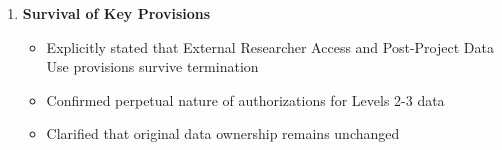 \documentclass[12pt,letterpaper]{article}
\begin{document}
\begin{enumerate}
\item \textbf{Survival of Key Provisions}
   \begin{itemize}
   \item Explicitly stated that External Researcher Access and Post-Project Data Use provisions survive termination
   \item Confirmed perpetual nature of authorizations for Levels 2-3 data
   \item Clarified that original data ownership remains unchanged
   \end{itemize}
\end{enumerate}
\end{document}
